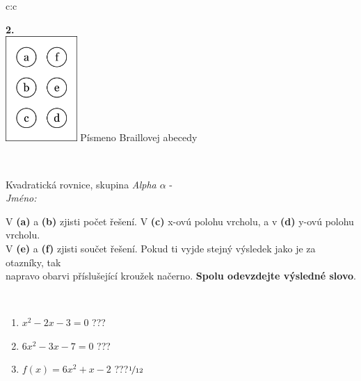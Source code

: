 \documentclass[10pt]{report}
\begin{document}
\begin{tabular}{c:c}
\begin{minipage}[c][104.5mm][t]{0.5\linewidth}
\begin{center}
\begin{minipage}{0.20\linewidth}
\begin{center}
{\Huge\bfseries 2.} \\[2mm]
\includegraphics[height=40mm]{../images/braille.png}
{\small Písmeno Braillovej abecedy}
\end{center}
\end{minipage}
\end{center}
\end{minipage}
\\ \hdashline
\begin{minipage}[c][104.5mm][t]{0.5\linewidth}
\begin{center}
\vspace{7mm}
{\huge Kvadratická rovnice, skupina \textit{Alpha $\alpha$} -}\\[5mm]
\textit{Jméno:}\phantom{xxxxxxxxxxxxxxxxxxxxxxxxxxxxxxxxxxxxxxxxxxxxxxxxxxxxxxxxxxxxxxxxx}\\[5mm]
\begin{minipage}{0.95\linewidth}
\begin{center}
V \textbf{(a)} a \textbf{(b)} zjisti počet řešení. V \textbf{(c)} x-ovú polohu vrcholu, a v \textbf{(d)} y-ovú polohu vrcholu.\\V \textbf{(e)} a \textbf{(f)} zjisti součet řešení. Pokud ti vyjde stejný výsledek jako je za otazníky, tak\\napravo obarvi příslušející kroužek načerno. \textbf{Spolu odevzdejte výsledné slovo}.
\end{center}
\end{minipage}
\\[1mm]
\begin{minipage}{0.79\linewidth}
\begin{center}
\begin{varwidth}{\linewidth}
\begin{enumerate}
\Large
\item $x^2-2x-3=0$\quad \dotfill\; ???\;\dotfill {}
\item $6x^2-3x-7=0$\quad \dotfill\; ???\;\dotfill {}
\item $f(x)=6x^2+x-2$\quad \dotfill\; ???\;\dotfill \quad $\nicefrac{1}{12}$

\end{enumerate}
\end{varwidth}
\end{center}
\end{minipage}
\end{center}
\end{minipage}
\end{tabular}
\end{document}
